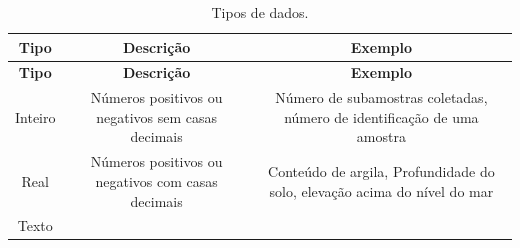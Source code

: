 \documentclass[a4paper,dvipsnames]{tufte-book}
\begin{document}
\begin{longtable}[]{@{}ccc@{}}
\caption{Tipos de dados.}\tabularnewline
\toprule
\begin{minipage}[b]{0.13\columnwidth}\centering\strut
\textbf{Tipo}\strut
\end{minipage} & \begin{minipage}[b]{0.39\columnwidth}\centering\strut
\textbf{Descrição}\strut
\end{minipage} & \begin{minipage}[b]{0.39\columnwidth}\centering\strut
\textbf{Exemplo}\strut
\end{minipage}\tabularnewline
\midrule
\endfirsthead
\toprule
\begin{minipage}[b]{0.13\columnwidth}\centering\strut
\textbf{Tipo}\strut
\end{minipage} & \begin{minipage}[b]{0.39\columnwidth}\centering\strut
\textbf{Descrição}\strut
\end{minipage} & \begin{minipage}[b]{0.39\columnwidth}\centering\strut
\textbf{Exemplo}\strut
\end{minipage}\tabularnewline
\midrule
\endhead
\begin{minipage}[t]{0.13\columnwidth}\centering\strut
Inteiro\strut
\end{minipage} & \begin{minipage}[t]{0.39\columnwidth}\centering\strut
Números positivos ou negativos sem casas decimais\strut
\end{minipage} & \begin{minipage}[t]{0.39\columnwidth}\centering\strut
Número de subamostras coletadas, número de identificação de uma
amostra\strut
\end{minipage}\tabularnewline
\begin{minipage}[t]{0.13\columnwidth}\centering\strut
Real\strut
\end{minipage} & \begin{minipage}[t]{0.39\columnwidth}\centering\strut
Números positivos ou negativos com casas decimais\strut
\end{minipage} & \begin{minipage}[t]{0.39\columnwidth}\centering\strut
Conteúdo de argila, Profundidade do solo, elevação acima do nível do
mar\strut
\end{minipage}\tabularnewline
\begin{minipage}[t]{0.13\columnwidth}\centering\strut
Texto\strut
\end{minipage} & \begin{minipage}[t]{0.39\columnwidth}\centering\strut

\end{minipage}
\end{longtable}
\end{document}
